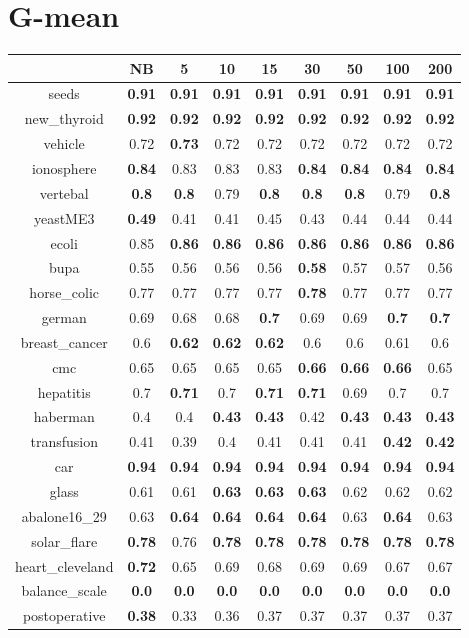 \documentclass{article}%
\begin{document}
%
\section*{G{-}mean}%
\begin{tabular}{c|cccccccc}%
\hline%
&NB&5&10&15&30&50&100&200\\%
\hline%
seeds&\textbf{0.91}&\textbf{0.91}&\textbf{0.91}&\textbf{0.91}&\textbf{0.91}&\textbf{0.91}&\textbf{0.91}&\textbf{0.91}\\%
new\_thyroid&\textbf{0.92}&\textbf{0.92}&\textbf{0.92}&\textbf{0.92}&\textbf{0.92}&\textbf{0.92}&\textbf{0.92}&\textbf{0.92}\\%
vehicle&0.72&\textbf{0.73}&0.72&0.72&0.72&0.72&0.72&0.72\\%
ionosphere&\textbf{0.84}&0.83&0.83&0.83&\textbf{0.84}&\textbf{0.84}&\textbf{0.84}&\textbf{0.84}\\%
vertebal&\textbf{0.8}&\textbf{0.8}&0.79&\textbf{0.8}&\textbf{0.8}&\textbf{0.8}&0.79&\textbf{0.8}\\%
yeastME3&\textbf{0.49}&0.41&0.41&0.45&0.43&0.44&0.44&0.44\\%
ecoli&0.85&\textbf{0.86}&\textbf{0.86}&\textbf{0.86}&\textbf{0.86}&\textbf{0.86}&\textbf{0.86}&\textbf{0.86}\\%
bupa&0.55&0.56&0.56&0.56&\textbf{0.58}&0.57&0.57&0.56\\%
horse\_colic&0.77&0.77&0.77&0.77&\textbf{0.78}&0.77&0.77&0.77\\%
german&0.69&0.68&0.68&\textbf{0.7}&0.69&0.69&\textbf{0.7}&\textbf{0.7}\\%
breast\_cancer&0.6&\textbf{0.62}&\textbf{0.62}&\textbf{0.62}&0.6&0.6&0.61&0.6\\%
cmc&0.65&0.65&0.65&0.65&\textbf{0.66}&\textbf{0.66}&\textbf{0.66}&0.65\\%
hepatitis&0.7&\textbf{0.71}&0.7&\textbf{0.71}&\textbf{0.71}&0.69&0.7&0.7\\%
haberman&0.4&0.4&\textbf{0.43}&\textbf{0.43}&0.42&\textbf{0.43}&\textbf{0.43}&\textbf{0.43}\\%
transfusion&0.41&0.39&0.4&0.41&0.41&0.41&\textbf{0.42}&\textbf{0.42}\\%
car&\textbf{0.94}&\textbf{0.94}&\textbf{0.94}&\textbf{0.94}&\textbf{0.94}&\textbf{0.94}&\textbf{0.94}&\textbf{0.94}\\%
glass&0.61&0.61&\textbf{0.63}&\textbf{0.63}&\textbf{0.63}&0.62&0.62&0.62\\%
abalone16\_29&0.63&\textbf{0.64}&\textbf{0.64}&\textbf{0.64}&\textbf{0.64}&0.63&\textbf{0.64}&0.63\\%
solar\_flare&\textbf{0.78}&0.76&\textbf{0.78}&\textbf{0.78}&\textbf{0.78}&\textbf{0.78}&\textbf{0.78}&\textbf{0.78}\\%
heart\_cleveland&\textbf{0.72}&0.65&0.69&0.68&0.69&0.69&0.67&0.67\\%
balance\_scale&\textbf{0.0}&\textbf{0.0}&\textbf{0.0}&\textbf{0.0}&\textbf{0.0}&\textbf{0.0}&\textbf{0.0}&\textbf{0.0}\\%
postoperative&\textbf{0.38}&0.33&0.36&0.37&0.37&0.37&0.37&0.37\\%
\end{tabular}

%
\end{document}
